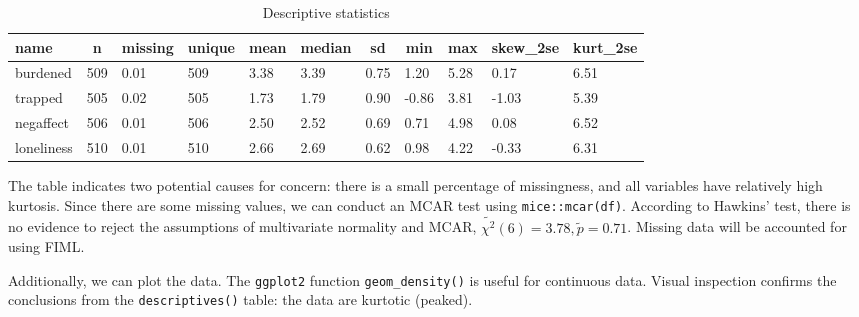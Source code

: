 \documentclass[
  man,floatsintext]{apa6}
\begin{document}
\begin{table}[tbp]

\begin{center}
\begin{threeparttable}

\caption{\label{tab:tabdesc}Descriptive statistics}

\begin{tabular}{lllllllllll}
\toprule
name & \multicolumn{1}{c}{n} & \multicolumn{1}{c}{missing} & \multicolumn{1}{c}{unique} & \multicolumn{1}{c}{mean} & \multicolumn{1}{c}{median} & \multicolumn{1}{c}{sd} & \multicolumn{1}{c}{min} & \multicolumn{1}{c}{max} & \multicolumn{1}{c}{skew\_2se} & \multicolumn{1}{c}{kurt\_2se}\\
\midrule
burdened & 509 & 0.01 & 509 & 3.38 & 3.39 & 0.75 & 1.20 & 5.28 & 0.17 & 6.51\\
trapped & 505 & 0.02 & 505 & 1.73 & 1.79 & 0.90 & -0.86 & 3.81 & -1.03 & 5.39\\
negaffect & 506 & 0.01 & 506 & 2.50 & 2.52 & 0.69 & 0.71 & 4.98 & 0.08 & 6.52\\
loneliness & 510 & 0.01 & 510 & 2.66 & 2.69 & 0.62 & 0.98 & 4.22 & -0.33 & 6.31\\
\bottomrule
\end{tabular}

\end{threeparttable}
\end{center}

\end{table}

The table indicates two potential causes for concern: there is a small percentage of missingness, and all variables have relatively high kurtosis.
Since there are some missing values, we can conduct an MCAR test using \texttt{mice::mcar(df)}.
According to Hawkins' test, there is no evidence to reject the assumptions of multivariate normality and MCAR, \(\tilde{\chi^2}(6) = 3.78, \tilde{p} = 0.71\).
Missing data will be accounted for using FIML.

Additionally, we can plot the data.
The \texttt{ggplot2} function \texttt{geom\_density()} is useful for continuous data.
Visual inspection confirms the conclusions from the \texttt{descriptives()} table: the data are kurtotic (peaked).
\end{document}
